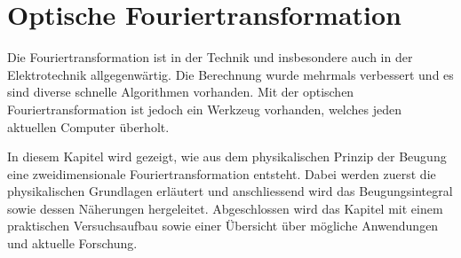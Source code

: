 %
%
%
%

\newcommand{\opttodo}[1] {\textbf{\textcolor{red}{TODO: #1}}}
\newcommand{\optrh}{\opttodo{REF HERE}}

\chapter{Optische Fouriertransformation\label{chapter:opt}}
\begin{refsection}

Die Fouriertransformation ist in der Technik und insbesondere auch in der Elektrotechnik allgegenwärtig.
Die Berechnung wurde mehrmals verbessert und es sind diverse schnelle Algorithmen vorhanden.
Mit der optischen Fouriertransformation ist jedoch ein Werkzeug vorhanden, welches jeden aktuellen Computer überholt.

In diesem Kapitel wird gezeigt, wie aus dem physikalischen Prinzip der Beugung eine zweidimensionale Fouriertransformation entsteht.
Dabei werden zuerst die physikalischen Grundlagen erläutert und anschliessend wird das Beugungsintegral sowie dessen Näherungen hergeleitet.
Abgeschlossen wird das Kapitel mit einem praktischen Versuchsaufbau sowie einer Übersicht über mögliche Anwendungen und aktuelle Forschung.






\printbibliography[heading=subbibliography]
\end{refsection}
